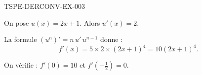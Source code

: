 \begin{corrige}{TSPE-DERCONV-EX-003}

On pose $u(x) = 2x+1$. Alors $u'(x) = 2$.


La formule $(u^n)' = n\,u'\,u^{n-1}$ donne :
\[ f'(x) = 5 \times 2 \times (2x+1)^4 = 10(2x+1)^4. \]

On vérifie : $f'(0) = 10$ et $f'\!\left(-\tfrac{1}{2}\right) = 0$.

\end{corrige}
